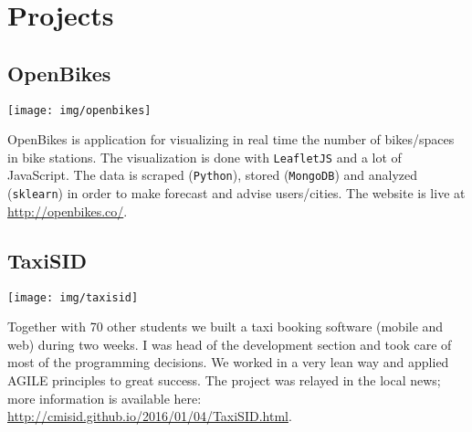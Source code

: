 \section{Projects}

\subsection{OpenBikes}
\noindent
\begin{minipage}{.15\textwidth}
\centerline{\texttt{[image: img/openbikes]}}
\end{minipage}%
\hspace{5mm}
\begin{minipage}{.8\textwidth}
\raggedright
OpenBikes is application for visualizing in real time the number of bikes/spaces in bike stations. The visualization is done with \texttt{LeafletJS} and a lot of JavaScript. The data is scraped (\texttt{Python}), stored (\texttt{MongoDB}) and analyzed (\texttt{sklearn}) in order to make forecast and advise users/cities. The website is live at \textcolor{cyan}{\url{http://openbikes.co/}}.
\end{minipage}

\subsection{TaxiSID}
\noindent
\begin{minipage}{.15\textwidth}
\centerline{\texttt{[image: img/taxisid]}}
\end{minipage}%
\hspace{5mm}
\begin{minipage}{.8\textwidth}
\raggedright
Together with 70 other students we built a taxi booking software (mobile and web) during two weeks. I was head of the development section and took care of most of the programming decisions. We worked in a very lean way and applied AGILE principles to great success. The project was relayed in the local news; more information is available here: \textcolor{cyan}{\url{http://cmisid.github.io/2016/01/04/TaxiSID.html}}.
\end{minipage}

